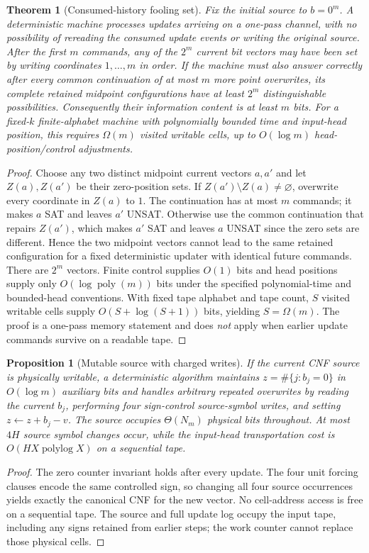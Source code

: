 \documentclass[11pt]{article}
\newtheorem{theorem}{Theorem}
\newtheorem{proposition}{Proposition}
\newcommand{\polylog}{\operatorname{polylog}}
\begin{document}
\begin{theorem}[Consumed-history fooling set]\label{thm:stream}
Fix the initial source to $b=0^m$.  A deterministic machine processes
updates arriving on a one-pass channel, with no possibility of rereading
the consumed update events or writing the original source.  After the first
$m$ commands, any of the $2^m$ current bit vectors may have been set by
writing coordinates $1,\dots,m$ in order.  If the machine must also
answer correctly after every common continuation of at most $m$ more
point overwrites, its complete retained midpoint configurations have
at least $2^m$ distinguishable possibilities.
Consequently their information content is at least $m$ bits.  For a
fixed-$k$ finite-alphabet machine with polynomially bounded time and
input-head position, this requires $\Omega(m)$ visited writable cells,
up to $O(\log m)$ head-position/control adjustments.
\end{theorem}
\begin{proof}
Choose any two distinct midpoint current vectors $a,a'$ and let
$Z(a),Z(a')$ be their zero-position sets.  If
$Z(a')\setminus Z(a)\ne\varnothing$, overwrite every coordinate in
$Z(a)$ to $1$.  The continuation has at most $m$ commands; it makes
$a$ SAT and leaves $a'$ UNSAT.  Otherwise use the common continuation
that repairs $Z(a')$, which makes $a'$ SAT and leaves $a$ UNSAT since
the zero sets are different.  Hence the two midpoint vectors cannot
lead to the same retained configuration for a fixed deterministic
updater with identical future commands.  There are $2^m$ vectors.
Finite control supplies $O(1)$ bits and head positions supply only
$O(\log\operatorname{poly}(m))$ bits under the specified polynomial-time
and bounded-head conventions.  With fixed tape alphabet and tape count,
$S$ visited writable cells supply $O(S+\log(S+1))$ bits, yielding
$S=\Omega(m)$.  The proof is a one-pass memory statement and does
\emph{not} apply when earlier update commands survive on a readable tape.
\end{proof}

\begin{proposition}[Mutable source with charged writes]\label{prop:rw}
If the current CNF source is physically writable, a deterministic
algorithm maintains $z=\#\{j:b_j=0\}$ in $O(\log m)$ auxiliary bits and
handles arbitrary repeated overwrites by reading the current $b_j$,
performing four sign-control source-symbol writes, and setting
$z\leftarrow z+b_j-v$.  The source occupies $\Theta(N_m)$ physical bits
throughout.  At most $4H$ source symbol \emph{changes} occur, while the
input-head transportation cost is $O(HX\polylog X)$ on a sequential tape.
\end{proposition}
\begin{proof}
The zero counter invariant holds after every update.  The four unit
forcing clauses encode the same controlled sign, so changing all four
source occurrences yields exactly the canonical CNF for the new vector.
No cell-address access is free on a sequential tape.  The source and
full update log occupy the input tape, including any signs retained from
earlier steps; the work counter cannot replace those physical cells.
\end{proof}
\end{document}
